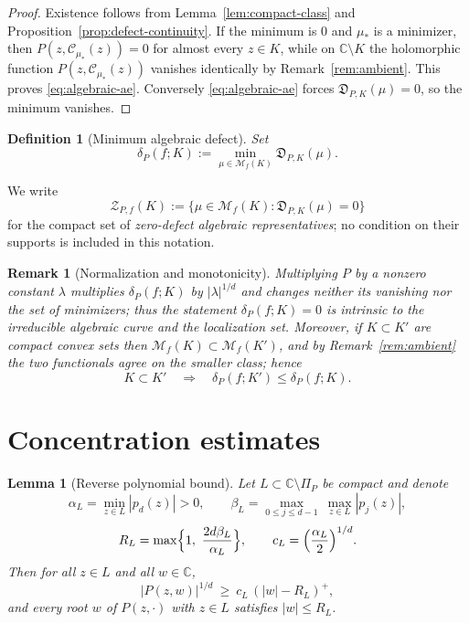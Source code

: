 \documentclass[10pt,a4paper]{amsart}
\newtheorem{lemma}[theorem]{Lemma}
\newtheorem{definition}[theorem]{Definition}
\newtheorem{remark}[theorem]{Remark}
\newcommand{\bC}{\mathbb C}
\newcommand{\M}{\mathcal M}
\newcommand{\Cauchy}{\mathcal C}
\begin{document}
\begin{proof}
Existence follows from Lemma~\ref{lem:compact-class} and
Proposition~\ref{prop:defect-continuity}.  If the minimum is $0$ and $\mu_*$ is
a minimizer, then $P(z,\Cauchy_{\mu_*}(z))=0$ for almost every $z\in K$, while
on $\bC\setminus K$ the holomorphic function
$P(z,\Cauchy_{\mu_*}(z))$ vanishes identically by
Remark~\ref{rem:ambient}.  This proves
\eqref{eq:algebraic-ae}.  Conversely \eqref{eq:algebraic-ae} forces
$\mathfrak D_{P,K}(\mu)=0$, so the minimum vanishes.
\end{proof}

\begin{definition}[Minimum algebraic defect]
\label{def:delta}
Set
\begin{equation}\label{eq:delta}
 \delta_P(f;K)
 :=\min_{\mu\in\M_f(K)}\mathfrak D_{P,K}(\mu).
\end{equation}
\end{definition}

We write
\begin{equation}\label{eq:zero-set}
 \mathcal Z_{P,f}(K)
 :=\{\mu\in\M_f(K):\mathfrak D_{P,K}(\mu)=0\}
\end{equation}
for the compact set of \emph{zero-defect algebraic representatives}; no
condition on their supports is included in this notation.

\begin{remark}[Normalization and monotonicity]\label{rem:monotone}
Multiplying $P$ by a nonzero constant $\lambda$ multiplies $\delta_P(f;K)$ by
$|\lambda|^{1/d}$ and changes neither its vanishing nor the set of minimizers;
thus the statement $\delta_P(f;K)=0$ is intrinsic to the irreducible algebraic
curve and the localization set.  Moreover, if $K\subset K'$ are compact convex
sets then $\M_f(K)\subset\M_f(K')$, and by Remark~\ref{rem:ambient} the two
functionals agree on the smaller class; hence
\[
 K\subset K'\quad\Longrightarrow\quad \delta_P(f;K')\leq\delta_P(f;K).
\]
\end{remark}

\section{Concentration estimates}\label{sec:quantitative}

\begin{lemma}[Reverse polynomial bound]\label{lem:reverse}
Let $L\subset\bC\setminus\Pi_P$ be compact and denote 
\[
 \alpha_L=\min_{z\in L}|p_d(z)|>0,\qquad
 \beta_L=\max_{0\leq j\leq d-1}\ \max_{z\in L}|p_j(z)| ,
\]
\[
 R_L=\max\Bigl\{1,\ \frac{2d\beta_L}{\alpha_L}\Bigr\},
 \qquad
 c_L=\Bigl(\frac{\alpha_L}{2}\Bigr)^{1/d}.
\]
Then for all $z\in L$ and all $w\in\bC$,
\begin{equation}\label{eq:reverse}
 |P(z,w)|^{1/d}\ \geq\ c_L\,(|w|-R_L)^{+} ,
\end{equation}
and every root $w$ of $P(z,\cdot)$ with $z\in L$ satisfies $|w|\leq R_L$.
\end{lemma}
\end{document}
